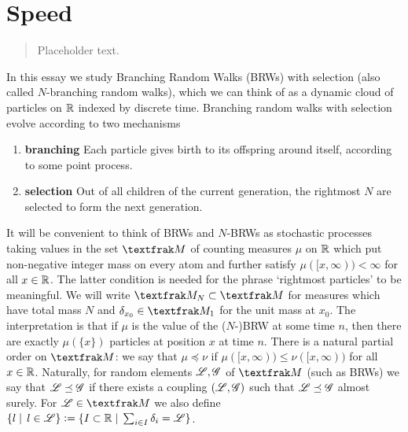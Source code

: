 \section{Speed}

\begin{quote}
{\small Placeholder text. }
\end{quote}

In this essay we study Branching Random Walks (BRWs) with selection (also called $N$-branching random walks), which we can think of as a dynamic cloud of particles on $\mathbb{R}$ indexed by discrete time. Branching random walks with selection evolve according to two mechanisms 
\begin{enumerate}[1]
\item \vspace{-2mm}\textbf{branching} Each particle gives birth to its offspring around itself, according to some point process. \\
\item \vspace{-6mm}\textbf{selection} Out of all children of the current generation, the rightmost $N$ are selected to form the next generation. \\
\end{enumerate}
\vspace{-5mm}It will be convenient to think of BRWs and $N$-BRWs as stochastic processes taking values in the set $\frak{M}$ of counting measures $\mu$ on $\mathbb{R}$ which put non-negative integer mass on every atom and further satisfy $\mu([x, \infty)) < \infty$ for all $x \in \mathbb{R}$. The latter condition is needed for the phrase `rightmost particles' to be meaningful. We will write $\frak{M}_N \subset \frak{M}$ for measures which have total mass $N$ and $\delta_{x_0} \in \frak{M}_1$ for the unit mass at $x_0$. The interpretation is that if $\mu$ is the value of the ($N$-)BRW at some time $n$, then there are exactly $\mu(\{x\})$ particles at position $x$ at time $n$. There is a natural partial order on $\frak{M}$: we say that $\mu \preceq \nu$ if $\mu([x, \infty)) \leq \nu([x, \infty))$ for all $x \in \mathbb{R}$. Naturally, for random elements $\mathscr{L}, \mathscr{G}$ of $\frak{M}$ (such as BRWs) we say that $\mathscr{L} \preceq \mathscr{G}$ if there exists a coupling $(\mathscr{L}, \mathscr{G})$ such that $\mathscr{L} \preceq \mathscr{G}$ almost surely. For $\scr{L} \in \frak{M}$ we also define $\{ l \mid\,l \in \mathscr{L}\} \vcentcolon= \{ I \subset \mathbb{R} \mid\, \sum_{i \in I} \delta_{i} = \mathscr{L}\}$. \\

